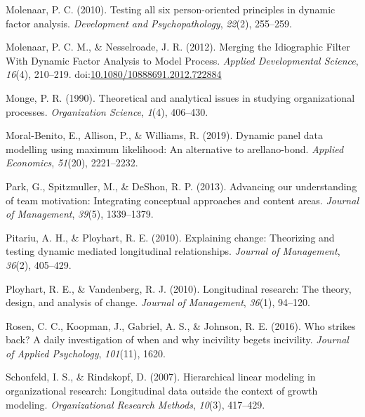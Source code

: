 \documentclass[english,,man]{apa6}
\theoremstyle{definition}
\theoremstyle{definition}
\theoremstyle{definition}
\theoremstyle{remark}
\begin{document}
\leavevmode\hypertarget{ref-molenaar_testing_2010}{}%
Molenaar, P. C. (2010). Testing all six person-oriented principles in
dynamic factor analysis. \emph{Development and Psychopathology},
\emph{22}(2), 255--259.

\leavevmode\hypertarget{ref-molenaar_merging_2012}{}%
Molenaar, P. C. M., \& Nesselroade, J. R. (2012). Merging the
Idiographic Filter With Dynamic Factor Analysis to Model Process.
\emph{Applied Developmental Science}, \emph{16}(4), 210--219.
doi:\href{https://doi.org/10.1080/10888691.2012.722884}{10.1080/10888691.2012.722884}

\leavevmode\hypertarget{ref-monge_theoretical_1990}{}%
Monge, P. R. (1990). Theoretical and analytical issues in studying
organizational processes. \emph{Organization Science}, \emph{1}(4),
406--430.

\leavevmode\hypertarget{ref-moral2019dynamic}{}%
Moral-Benito, E., Allison, P., \& Williams, R. (2019). Dynamic panel
data modelling using maximum likelihood: An alternative to
arellano-bond. \emph{Applied Economics}, \emph{51}(20), 2221--2232.

\leavevmode\hypertarget{ref-park2013advancing}{}%
Park, G., Spitzmuller, M., \& DeShon, R. P. (2013). Advancing our
understanding of team motivation: Integrating conceptual approaches and
content areas. \emph{Journal of Management}, \emph{39}(5), 1339--1379.

\leavevmode\hypertarget{ref-pitariu_explaining_2010}{}%
Pitariu, A. H., \& Ployhart, R. E. (2010). Explaining change: Theorizing
and testing dynamic mediated longitudinal relationships. \emph{Journal
of Management}, \emph{36}(2), 405--429.

\leavevmode\hypertarget{ref-ployhart_longitudinal_2010}{}%
Ployhart, R. E., \& Vandenberg, R. J. (2010). Longitudinal research: The
theory, design, and analysis of change. \emph{Journal of Management},
\emph{36}(1), 94--120.

\leavevmode\hypertarget{ref-rosen_who_2016}{}%
Rosen, C. C., Koopman, J., Gabriel, A. S., \& Johnson, R. E. (2016). Who
strikes back? A daily investigation of when and why incivility begets
incivility. \emph{Journal of Applied Psychology}, \emph{101}(11), 1620.

\leavevmode\hypertarget{ref-schonfeld2007hierarchical}{}%
Schonfeld, I. S., \& Rindskopf, D. (2007). Hierarchical linear modeling
in organizational research: Longitudinal data outside the context of
growth modeling. \emph{Organizational Research Methods}, \emph{10}(3),
417--429.
\end{document}
